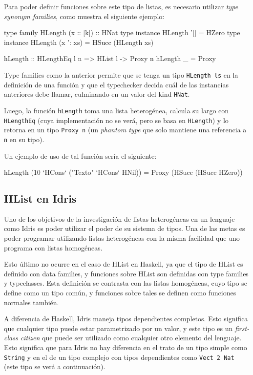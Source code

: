 Para poder definir funciones sobre este tipo de listas, es necesario utilizar \textit{type synonym families}, como muestra el siguiente ejemplo:

\begin{code}
type family HLength (x :: [k]) :: HNat
type instance HLength '[] = HZero
type instance HLength (x ': xs) = HSucc (HLength xs)

hLength   :: HLengthEq l n => HList l -> Proxy n
hLength _ =  Proxy
\end{code}

Type families como la anterior permite que se tenga un tipo \texttt{HLength ls} en la definición de una función y que el typechecker decida cuál de las instancias anteriores debe llamar, culminando en un valor del kind \texttt{HNat}.

Luego, la función \texttt{hLength} toma una lista heterogénea, calcula su largo con \texttt{HLengthEq} (cuya implementación no se verá, pero se basa en \texttt{HLength}) y lo retorna en un tipo \texttt{Proxy n} (un \textit{phantom type} que solo mantiene una referencia a \texttt{n} en su tipo).

Un ejemplo de uso de tal función sería el siguiente:

\begin{code}
hLength (10 `HCons` ("Texto" `HCons` HNil)) = 
  Proxy (HSucc (HSucc HZero))
\end{code}

\subsection{HList en Idris}

Uno de los objetivos de la investigación de listas heterogéneas en un lenguaje como Idris es poder utilizar el poder de su sistema de tipos. Una de las metas es poder programar utilizando listas heterogéneas con la misma facilidad que uno programa con listas homogéneas.

Esto último no ocurre en el caso de HList en Haskell, ya que el tipo de HList es definido con data families, y funciones sobre HList son definidas con type families y typeclasses. Esta definición se contrasta con las listas homogéneas, cuyo tipo se define como un tipo común, y funciones sobre tales se definen como funciones normales también.

A diferencia de Haskell, Idris maneja tipos dependientes completos. Esto significa que cualquier tipo puede estar parametrizado por un valor, y este tipo es un \textit{first-class citizen} que puede ser utilizado como cualquier otro elemento del lenguaje. Esto significa que para Idris no hay diferencia en el trato de un tipo simple como \texttt{String} y en el de un tipo complejo con tipos dependientes como \texttt{Vect 2 Nat} (este tipo se verá a continuación).

